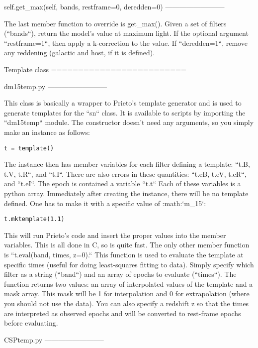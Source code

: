 self.get_max(self, bands, restframe=0, deredden=0)
--------------------------

The last member function to override is get_max(). Given a set of
filters (``bands``), return the model's value at maximum light.
If the optional argument ``restframe=1``, then apply a k-correction
to the value. If ``deredden=1``, remove any reddening (galactic
and host, if it is defined). 


Template class\label{sec:Template-class}
=========================


dm15temp.py
--------------------------

This class is basically a wrapper to Prieto's template generator and
is used to generate templates for the ``sn`` class. It is available
to scripts by importing the ``dm15temp`` module. The constructor
doesn't need any arguments, so you simply make an instance as follows:

\begin{verbatim}
t = template()
\end{verbatim}

The instance then has member variables for each filter defining a
template: ``t.B, t.V, t.R``, and ``t.I``. There are also
errors in these quantities: ``t.eB, t.eV, t.eR``, and ``t.eI``.
The epoch is contained a variable ``t.t`` Each of these variables
is a python array. Immediately after creating the instance, there
will be no template defined. One has to make it with a specific value
of :math:`\Delta m_{15}`:

\begin{verbatim}
t.mktemplate(1.1)
\end{verbatim}

This will run Prieto's code and insert the proper values into the
member variables. This is all done in C, so is quite fast. The only
other member function is ``t.eval(band, times, z=0).`` This function
is used to evaluate the template at specific times (useful for doing
least-squares fitting to data). Simply specify which filter as a string
(``band``) and an array of epochs to evaluate (``times``).
The function returns two values: an array of interpolated values of
the template and a mask array. This mask will be 1 for interpolation
and 0 for extrapolation (where you should not use the data). You can
also specify a redshift z so that the times are interpreted as observed
epochs and will be converted to rest-frame epochs before evaluating.


CSPtemp.py
--------------------------

